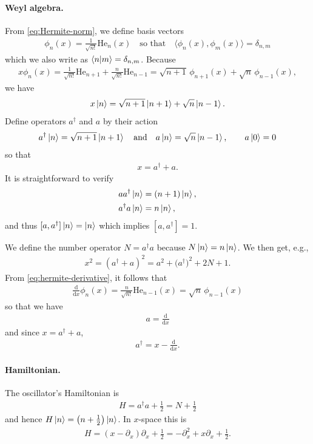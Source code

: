 \documentclass[a4paper,11pt]{article}
\numberwithin{equation}{section}
\theoremstyle{plain}
\theoremstyle{definition}
\theoremstyle{remark}
\newcommand{\1}{\ensuremath{\mathds{1}}\xspace}
\newcommand{\dd}{\ensuremath{{\textrm{d}}}\xspace}
\begin{document}
\paragraph{Weyl algebra.}
From \eqref{eq:Hermite-norm}, we define basis vectors
\begin{align}
    \phi_n(x)=\frac{1}{\sqrt{n!}}\mathrm{He}_n(x)\quad\text{so that}\quad\langle\phi_n(x),\phi_m(x)\rangle=\delta_{n,m}
\end{align}
which we also write as $\braket{n|m}=\delta_{n,m}$.
Because
\begin{align}
    x\phi_n(x)=\frac{1}{\sqrt{n!}}\mathrm{He}_{n+1}+\frac{n}{\sqrt{n!}}\mathrm{He}_{n-1}
    =\sqrt{n+1}\,\phi_{n+1}(x)+\sqrt{n}\,\phi_{n-1}(x),
\end{align}
we have
\begin{align}
    x\ket{n}=\sqrt{n+1}\ket{n+1}+\sqrt{n}\ket{n-1}.
\end{align}
Define operators $a^\dagger$ and $a$ by their action
\begin{align}
    a^\dagger\ket{n}=\sqrt{n+1}\ket{n+1}\quad\text{and}\quad a\ket{n}=\sqrt{n}\ket{n-1},\qquad a\ket{0}=0\label{eq:hermite-ladder}
\end{align}
so that
\begin{align}
    x=a^\dagger+a.
\end{align}
It is straightforward to verify
\begin{align}
    aa^\dagger\ket{n}&=(n+1)\ket{n},\\
    a^\dagger a\ket{n}&=n\ket{n},
\end{align}
and thus $[a,a^\dagger]\ket{n}=\ket{n}$ which implies $[a,a^\dagger]=1$.

We define the number operator $N=a^\dagger a$ because $N\ket{n}=n\ket{n}$. We then get, e.g.,
\begin{align}
    x^2=(a^\dagger+a)^2=a^2+\big(a^{\dagger}\big)^2+2N+1.
\end{align}
From \eqref{eq:hermite-derivative}, it follows that 
\begin{align}
    \frac{\dd}{\dd x}\phi_n(x)=\frac{n}{\sqrt{n!}}\mathrm{He}_{n-1}(x)=\sqrt{n}\,\phi_{n-1}(x)
\end{align}
so that we have
\begin{align}
    a=\frac{\dd}{\dd x}
\end{align}
and since $x=a^\dagger+a$,
\begin{align}
    a^\dagger=x-\frac{\dd}{\dd x}.
\end{align}

\paragraph{Hamiltonian.}
The oscillator's Hamiltonian is 
\begin{align}
H=a^\dagger a+\frac{1}{2}=N+\frac{1}{2}
\end{align}
and hence $H\ket{n}=\left(n+\frac{1}{2}\right)\ket{n}$.
In $x$-space this is
\begin{align}
    H=(x-\partial_x)\partial_x+\frac{1}{2}=-\partial_x^2+x\partial_x+\frac{1}{2}.
\end{align}
\end{document}
